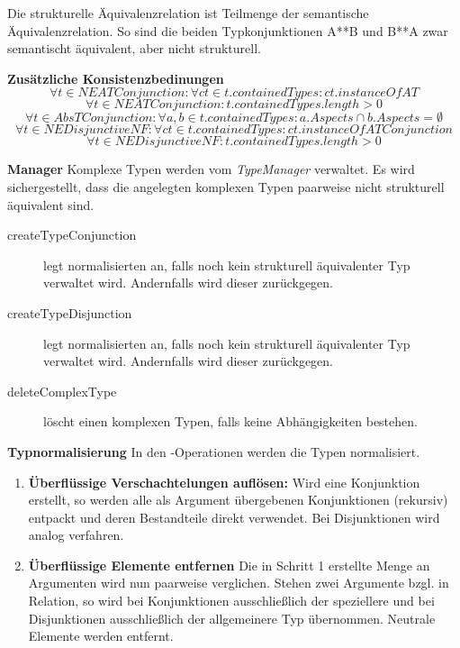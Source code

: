 Die strukturelle Äquivalenzrelation ist Teilmenge der semantische Äquivalenzrelation.
So sind die beiden Typkonjunktionen A**B und B**A zwar semantischt äquivalent, aber nicht strukturell.

\textbf{Zusätzliche Konsistenzbedinungen} \newline
\begin{equation}\forall t \in NEATConjunction : 
	\forall ct \in t.containedTypes : ct.instanceOf AT
\end{equation}
\begin{equation}\forall t \in NEATConjunction : 
	t.containedTypes.length > 0
\end{equation}
\begin{equation}\forall t \in AbsTConjunction : 
	\forall a,b \in t.containedTypes : a.Aspects \cap b.Aspects = \emptyset
\end{equation}
\begin{equation}\forall t \in NEDisjunctiveNF : 
	\forall ct \in t.containedTypes : ct.instanceOf ATConjunction
\end{equation}
\begin{equation}\forall t \in NEDisjunctiveNF : 
	t.containedTypes.length > 0
\end{equation}


\textbf{Manager} \newline
Komplexe Typen werden vom \emph{TypeManager} verwaltet. Es wird sichergestellt, dass 
die angelegten komplexen Typen paarweise nicht strukturell äquivalent sind. 

\begin{description}
\item[createTypeConjunction] legt normalisierten  an, falls noch kein strukturell äquivalenter Typ verwaltet wird. Andernfalls wird dieser zurückgegen.
\item[createTypeDisjunction] legt normalisierten  an, falls noch kein strukturell äquivalenter Typ verwaltet wird. Andernfalls wird dieser zurückgegen.
\item[deleteComplexType] löscht einen komplexen Typen, falls keine Abhängigkeiten bestehen.
\end{description}


\textbf{Typnormalisierung} \newline
In den -Operationen werden die Typen normalisiert. 
\begin{enumerate}
\item \textbf{Überflüssige Verschachtelungen auflösen:}  \newline 
	Wird eine Konjunktion erstellt, so werden alle als Argument übergebenen Konjunktionen (rekursiv) entpackt und deren Bestandteile direkt verwendet.
	Bei Disjunktionen wird analog verfahren. 
\item \textbf{Überflüssige Elemente entfernen}  \newline 
	Die in Schritt 1 erstellte Menge an Argumenten wird nun paarweise verglichen. Stehen zwei Argumente bzgl.  in Relation, so wird 
	bei Konjunktionen ausschließlich der speziellere und bei Disjunktionen ausschließlich der allgemeinere Typ übernommen. Neutrale Elemente werden 
	entfernt. 
\end{enumerate} 


